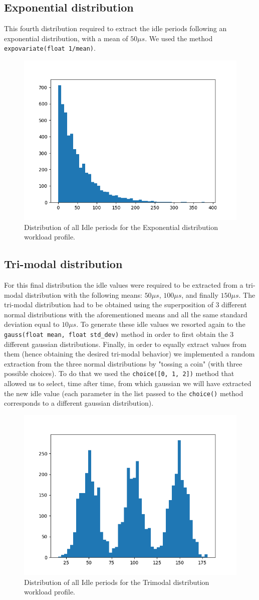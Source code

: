 \documentclass[a4paper]{article}
\begin{document}
    \subsection{Exponential distribution}
        This fourth distribution required to extract the idle periods following an exponential distribution, with a mean of $50 \mu s$. We used the method \texttt{expovariate(float 1/mean)}.
        \begin{figure}[htp]
            \centering
            \includegraphics[width=0.3 \columnwidth]{./screenshots/Idle4.png}
            \caption{
                    \label{fig:Active}
                    Distribution of all Idle periods for the Exponential distribution workload profile.
            }
        \end{figure}
    \subsection{Tri-modal distribution}
        For this final distribution the idle values were required to be extracted from a tri-modal distribution with the following means: $50 \mu s$, $100 \mu s$, and finally $150 \mu s$. The tri-modal distribution had to be obtained using the superposition of 3 different normal distributions with the aforementioned means and all the same standard deviation equal to $10 \mu s$.
        To generate these idle values we resorted again to the \texttt{gauss(float mean, float std\_dev)} method in order to first obtain the 3 different gaussian distributions. Finally, in order to equally extract values from them (hence obtaining the desired tri-modal behavior) we implemented a random extraction from the three normal distributions by "tossing a coin" (with three possible choices). To do that we used the \texttt{choice([0, 1, 2])} method that allowed us to select, time after time, from which gaussian we will have extracted the new idle value (each parameter in the list passed to the \texttt{choice()} method corresponds to a different gaussian  distribution).
        \begin{figure}[htp]
            \centering
            \includegraphics[width=0.3 \columnwidth]{./screenshots/Idle5.png}
            \caption{
                    \label{fig:Active}
                    Distribution of all Idle periods for the Trimodal distribution workload profile.
            }
        \end{figure}
%
\end{document}
